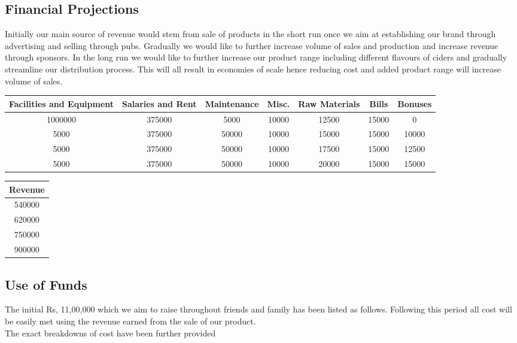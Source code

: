 \documentclass[11pt]{article}
\begin{document}
  \subsection{Financial Projections}
Initially our main source of revenue would stem from sale of products in the short run once we aim at establishing our brand through advertising and selling through pubs. Gradually we would like to further increase volume of sales and production and increase revenue through sponsors. In the long run we would like to further increase our product range including different flavours of ciders and gradually streamline our distribution process. This will all result in economies of scale hence reducing cost and added product range will increase volume of sales.

\begin{center}
\begin{tabular}[width=\textwidth]{| c | c | c | c | c | c | c |}
\hline
Facilities and Equipment & Salaries and Rent  & Maintenance & Misc. & Raw Materials & Bills & Bonuses \\ \hline \hline
1000000                  & 375000             & 5000        & 10000 & 12500         & 15000 & 0       \\
5000                     & 375000             & 50000       & 10000 & 15000         & 15000 & 10000   \\
5000                     & 375000             & 50000       & 10000 & 17500         & 15000 & 12500   \\
5000                     & 375000             & 50000       & 10000 & 20000         & 15000 & 15000   \\ \hline
\end{tabular}
\end{center}

\begin{center}
\begin{tabular}{| c | }
\hline
Revenue \\ \hline
540000 \\
620000 \\
750000 \\
900000 \\ \hline
\end{tabular}
\end{center}

  \subsection{Use of Funds}
The initial Rs, 11,00,000 which we aim to raise throughout friends and family has been listed as follows. 
Following this period all cost will be easily met using the revenue earned from the sale of our product. \\
The exact breakdowns of cost have been further provided
\end{document}
